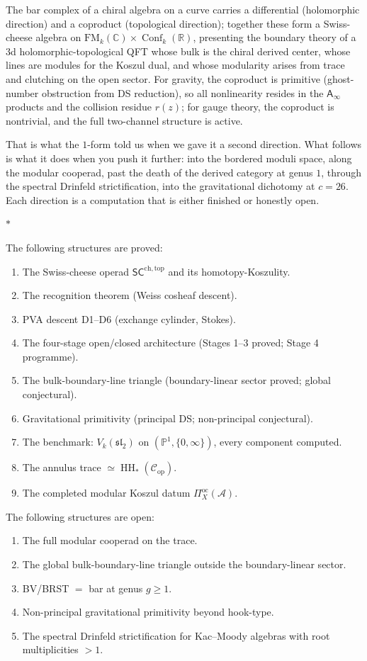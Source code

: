 \documentclass[11pt]{article}
\newcommand{\cA}{\mathcal{A}}
\newcommand{\cC}{\mathcal{C}}
\newcommand{\fsl}{\mathfrak{sl}}
\newcommand{\C}{\mathbb{C}}
\newcommand{\R}{\mathbb{R}}
\newcommand{\bP}{\mathbb{P}}
\newcommand{\Ainf}{\mathsf{A}_{\infty}}
\newcommand{\SCchtop}{\mathsf{SC}^{\mathrm{ch,top}}}
\newcommand{\FM}{\mathrm{FM}}
\newcommand{\HH}{\operatorname{HH}}
\DeclareMathOperator{\Conf}{Conf}
\newcommand{\sep}{\bigskip\begin{center}$*$\end{center}\medskip}
\begin{document}
The bar complex of a chiral algebra on a curve carries a
differential (holomorphic direction) and a coproduct (topological
direction); together these form a Swiss-cheese algebra on
$\FM_k(\C) \times \Conf_k(\R)$, presenting the boundary theory
of a $3$d holomorphic-topological QFT whose bulk is the chiral
derived center, whose lines are modules for the Koszul dual, and
whose modularity arises from trace and clutching on the open
sector.  For gravity, the coproduct is primitive (ghost-number
obstruction from DS reduction), so all nonlinearity resides in the
$\Ainf$ products and the collision residue $r(z)$; for gauge
theory, the coproduct is nontrivial, and the full two-channel
structure is active.

That is what the $1$-form told us when we gave it a second
direction.  What follows is what it does when you push it further:
into the bordered moduli space, along the modular cooperad, past
the death of the derived category at genus $1$, through the
spectral Drinfeld strictification, into the gravitational
dichotomy at $c = 26$.  Each direction is a computation that
is either finished or honestly open.

\sep

The following structures are proved:
\begin{enumerate}[nosep]
\item The Swiss-cheese operad $\SCchtop$ and its
  homotopy-Koszulity.
\item The recognition theorem (Weiss cosheaf descent).
\item PVA descent D1--D6 (exchange cylinder, Stokes).
\item The four-stage open/closed architecture (Stages 1--3
  proved; Stage 4 programme).
\item The bulk-boundary-line triangle (boundary-linear sector
  proved; global conjectural).
\item Gravitational primitivity (principal DS; non-principal
  conjectural).
\item The benchmark: $V_k(\fsl_2)$ on $(\bP^1, \{0,\infty\})$,
  every component computed.
\item The annulus trace $\simeq \HH_*(\cC_{\mathrm{op}})$.
\item The completed modular Koszul datum $\Pi^{\mathrm{oc}}_X(\cA)$.
\end{enumerate}

The following structures are open:
\begin{enumerate}[nosep]
\item The full modular cooperad on the trace.
\item The global bulk-boundary-line triangle outside the
  boundary-linear sector.
\item BV/BRST $=$ bar at genus $g \geq 1$.
\item Non-principal gravitational primitivity beyond hook-type.
\item The spectral Drinfeld strictification for Kac--Moody
  algebras with root multiplicities $> 1$.
\end{enumerate}
\end{document}
